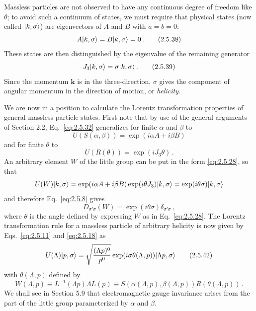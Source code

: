Massless particles are not observed to have any continuous degree of freedom
like $\theta$; to avoid such a continuum of states, we must require that
physical states (now called $\lvert k,\sigma\rangle$) are eigenvectors of $A$ and $B$
with $a=b=0$:
\begin{equation}
A\lvert k,\sigma\rangle=B\lvert k,\sigma\rangle=0\,.
\tag{2.5.38}\label{eq:2.5.38}
\end{equation}
These states are then distinguished by the eigenvalue of the remaining
generator
\begin{equation}
J_3\lvert k,\sigma\rangle=\sigma\lvert k,\sigma\rangle\,.
\tag{2.5.39}\label{eq:2.5.39}
\end{equation}
Since the momentum $\mathbf{k}$ is in the three-direction, $\sigma$ gives the
component of angular momentum in the direction of motion, or \emph{helicity}.

We are now in a position to calculate the Lorentz transformation properties of
general massless particle states. First note that by use of the general
arguments of Section 2.2, Eq.~\eqref{eq:2.5.32} generalizes for finite $\alpha$ and
$\beta$ to
\begin{equation}
U(S(\alpha,\beta))=\exp(i\alpha A+i\beta B)
\tag{2.5.40}\label{eq:2.5.40}
\end{equation}
and for finite $\theta$ to
\begin{equation}
U(R(\theta))=\exp(iJ_3\theta)\,.
\tag{2.5.41}\label{eq:2.5.41}
\end{equation}
An arbitrary element $W$ of the little group can be put in the form \eqref{eq:2.5.28},
so that
\[
U(W)\lvert k,\sigma\rangle
=\exp(i\alpha A+i\beta B)\exp(i\theta J_3)\lvert k,\sigma\rangle
=\exp(i\theta\sigma)\lvert k,\sigma\rangle
\]
and therefore Eq.~\eqref{eq:2.5.8} gives
\[
D_{\sigma'\sigma}(W)=\exp(i\theta\sigma)\delta_{\sigma'\sigma}\,,
\]
where $\theta$ is the angle defined by expressing $W$ as in Eq.~\eqref{eq:2.5.28}. The
Lorentz transformation rule for a massless particle of arbitrary helicity is
now given by Eqs.~\eqref{eq:2.5.11} and \eqref{eq:2.5.18} as
\begin{equation}
U(\Lambda)\lvert p,\sigma\rangle
=\sqrt{\frac{(\Lambda p)^0}{p^0}}
\exp(i\sigma\theta(\Lambda,p))\lvert \Lambda p,\sigma\rangle
\tag{2.5.42}\label{eq:2.5.42}
\end{equation}
with $\theta(\Lambda,p)$ defined by
\begin{equation}
W(\Lambda,p)\equiv L^{-1}(\Lambda p)\Lambda L(p)
\equiv S(\alpha(\Lambda,p),\beta(\Lambda,p))R(\theta(\Lambda,p))\,.
\tag{2.5.43}\label{eq:2.5.43}
\end{equation}
We shall see in Section 5.9 that electromagnetic gauge invariance arises from
the part of the little group parameterized by $\alpha$ and $\beta$.

